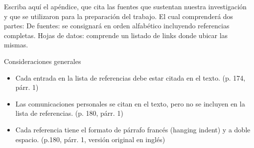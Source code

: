 \justifying

Escriba aquí el apéndice, que cita las fuentes que sustentan nuestra investigación y que se utilizaron para la preparación del trabajo. El cual comprenderá dos partes:
De fuentes: se consignará en orden alfabético incluyendo referencias completas.
Hojas de datos: comprende un listado de links donde ubicar las mismas.

Consideraciones generales
\begin{itemize}
    \item Cada entrada en la lista de referencias debe estar citada en el texto. (p. 174, párr. 1)
    \item Las comunicaciones personales se citan en el texto, pero no se incluyen en la lista de referencias. (p. 180, párr. 1)
    \item Cada referencia tiene el formato de párrafo francés (hanging indent) y a doble espacio. (p.180, párr. 1, versión original en inglés)
\end{itemize}